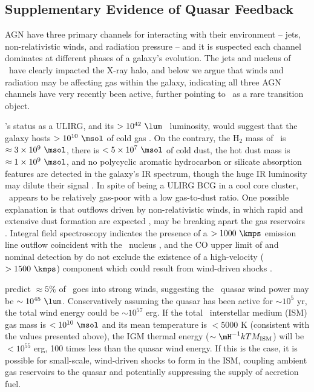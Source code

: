 \documentclass[useAMS,usenatbib]{mn2e}
\begin{document}
\subsection{Supplementary Evidence of Quasar Feedback}

AGN have three primary channels for interacting with their environment
-- jets, non-relativistic winds, and radiation pressure -- and it is
suspected each channel dominates at different phases of a galaxy's
evolution. The jets and nucleus of \irs\ have clearly impacted the
X-ray halo, and below we argue that winds and radiation may be
affecting gas within the galaxy, indicating all three AGN channels
have very recently been active, further pointing to \irs\ as a rare
transition object.

\irs's status as a ULIRG, and its $> 10^{42} ~\lum$
\halpha\ luminosity, would suggest that the galaxy hosts $> 10^{10}
~\msol$ of cold gas \citep[\eg][]{1988ApJ...325...74S, edge01}. On the
contrary, the H$_2$ mass of \irs\ is $\approx 3 \times 10^{9} ~\msol$,
there is $< 5 \times 10^7 ~\msol$ of cold dust, the hot dust mass is
$\approx 1 \times 10^9 ~\msol$, and no polycyclic aromatic hydrocarbon
or silicate absorption features are detected in the galaxy's IR
spectrum, though the huge IR luminosity may dilute their signal
\citep{1997A&A...318L...1T, 2004ApJ...613..986P, 2008ApJ...683..114S,
  2010arXiv1009.2040C}. In spite of being a ULIRG BCG in a cool core
cluster, \irs\ appears to be relatively gas-poor with a low
gas-to-dust ratio. One possible explanation is that outflows driven by
non-relativistic winds, in which rapid and extensive dust formation
are expected \citep{2002ApJ...567L.107E}, may be breaking apart the
gas reservoirs \citep[\eg][]{2010MNRAS.401....7H}. Integral field
spectroscopy indicates the presence of a $> 1000 ~\kmps$ emission line
outflow coincident with the \irs\ nucleus \citep{1996MNRAS.283.1003C},
and the CO upper limit of \citet{1998ApJ...506..205E} and nominal
detection by \citet{2010arXiv1009.2040C} do not exclude the existence
of a high-velocity ($> 1500 ~\kmps$) component which could result from
wind-driven shocks \citep[\eg][]{2010A&A...518L.155F}.  

\citet{2005ApJ...619...60L} predict $\approx 5\%$ of \lqso\ goes into
strong winds, suggesting the \irs\ quasar wind power may be $\sim
10^{45} ~\lum$. Conservatively assuming the quasar has been active for
$\sim 10^5$ yr, the total wind energy could be $\sim 10^{57}$ erg. If
the total \irs\ interstellar medium (ISM) gas mass is $< 10^{10}
~\msol$ and its mean temperature is $< 5000$ K (consistent with the
values presented above), the IGM thermal energy ($\sim \mH^{-1} kT
M_{\rm{ISM}}$) will be $< 10^{55}$ erg, 100 times less than the quasar
wind energy. If this is the case, it is possible for small-scale,
wind-driven shocks to form in the ISM, coupling ambient gas reservoirs
to the quasar and potentially suppressing the supply of accretion
fuel.
\end{document}
